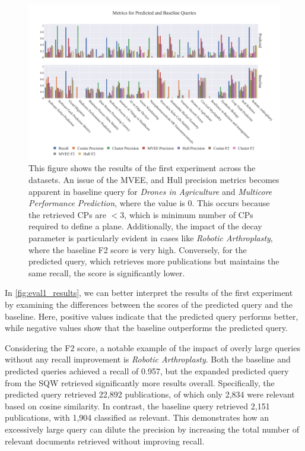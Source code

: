 \begin{figure}[!h]
	\hspace*{-1cm}	
	\includegraphics[scale=0.45]{pics/all-metrics-1.pdf}
	\caption[Evaluation: Experiment 1]{This figure shows the results of the first experiment across the datasets. An issue of the MVEE, and Hull precision metrics becomes apparent in baseline query for \textit{Drones in Agriculture} and \textit{Multicore Performance Prediction}, where the value is 0. This occurs because the retrieved CPs are $<3$, which is minimum number of CPs required to define a plane. Additionally, the impact of the decay parameter is particularly evident in cases like \textit{Robotic Arthroplasty}, where the baseline F2 score is very high. Conversely, for the predicted query, which retrieves more publications but maintains the same recall, the score is significantly lower.}\label{fig:all-metrics-1}
\end{figure}

In \autoref{fig:eval1_results}, we can better interpret the results of the first experiment by examining the differences between the scores of the predicted query and the baseline. Here, positive values indicate that the predicted query performs better, while negative values show that the baseline outperforms the predicted query. 

Considering the F2 score, a notable example of the impact of overly large queries without any recall improvement is \textit{Robotic Arthroplasty}. Both the baseline and predicted queries achieved a recall of 0.957, but the expanded predicted query from the SQW retrieved significantly more results overall. Specifically, the predicted query retrieved 22,892 publications, of which only 2,834 were relevant based on cosine similarity. In contrast, the baseline query retrieved 2,151 publications, with 1,904 classified as relevant. This demonstrates how an excessively large query can dilute the precision by increasing the total number of relevant documents retrieved without improving recall.

